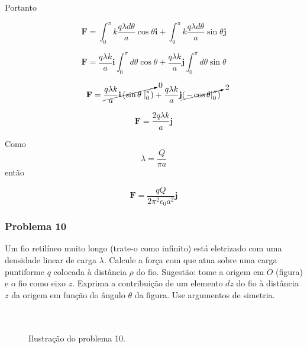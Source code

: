 \documentclass[a4paper, 12pt]{article}
\begin{document}
	Portanto
	
	\[
	\textbf{F}=\int_{0}^{\pi}k\frac{q\lambda d\theta}{a}\cos\theta\textbf{i}+\int_{0}^{\pi}k\frac{q\lambda d\theta}{a}\sin\theta\textbf{j}
	\]
	
	\[
	\textbf{F}=\frac{q\lambda k}{a}\textbf{i}\int_{0}^{\pi}d\theta\cos\theta+\frac{q\lambda k}{a}\textbf{j}\int_{0}^{\pi}d\theta\sin\theta
	\]
	
	
	\[
	\textbf{F}=\cancelto{0}{\frac{q\lambda k}{a}\textbf{i}\left(\sin\theta\left.\right|_{0}^\pi\right)}+\frac{q\lambda k}{a}\textbf{j}\cancelto{2}{\left(\left.-\cos\theta\right|_{0}^\pi\right)}
	\]
	
	\[
	\textbf{F}=\frac{2q\lambda k}{a}\textbf{j}
	\]
	
	Como \[\lambda=\frac{Q}{\pi a}\] então 
	
	\[
	\textbf{F}=\frac{q Q}{2\pi^2\epsilon_0 a^2}\textbf{j}
	\]
	
	\subsubsection{Problema 10}
	
	Um fio retilíneo muito longo (trate-o como infinito) está eletrizado com uma densidade linear de carga $\lambda$. Calcule a força com que atua sobre uma carga puntiforme $q$ colocada à distância $\rho$ do fio. Sugestão: tome a origem em $O$ (figura) e o fio como eixo $z$. Exprima a contribuição de um elemento $dz$ do fio à distância $z$ da origem em função do ângulo $\theta$ da figura. Use argumentos de simetria.\\ \\ \\
	
	\begin{figure}[ht]
		\centering
		\caption{Ilustração do problema 10.}
	\end{figure}
	
\end{document}
